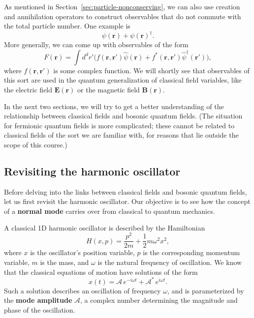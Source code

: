 \documentclass[prx,12pt]{revtex4-2}
\begin{document}
As mentioned in Section~\ref{sec:particle-nonconserving}, we can also
use creation and annihilation operators to construct observables that
do not commute with the total particle number.  One example is
\begin{equation*}
  \psi(\mathbf{r}) + \psi(\mathbf{r})^\dagger.
\end{equation*}
More generally, we can come up with observables of the form
\begin{equation}
  F(\mathbf{r}) = \int d^dr' \Big(f(\mathbf{r},\mathbf{r}') \hat{\psi}(\mathbf{r}) + f^*(\mathbf{r},\mathbf{r}') \hat{\psi}^\dagger(\mathbf{r}') \Big),
  \label{fieldop}
\end{equation}
where $f(\mathbf{r},\mathbf{r}')$ is some complex function.  We will
shortly see that observables of this sort are used in the quantum
generalization of classical field variables, like the electric field
$\mathbf{E}(\mathbf{r})$ or the magnetic field
$\mathbf{B}(\mathbf{r})$.

In the next two sections, we will try to get a better understanding of
the relationship between classical fields and bosonic quantum fields.
(The situation for fermionic quantum fields is more complicated; these
cannot be related to classical fields of the sort we are familiar
with, for reasons that lie outside the scope of this course.)

\subsection{Revisiting the harmonic oscillator}
\label{sec:ho}

Before delving into the links between classical fields and bosonic
quantum fields, let us first revisit the harmonic oscillator.  Our
objective is to see how the concept of a \textbf{normal mode} carries
over from classical to quantum mechanics.

A classical 1D harmonic oscillator is described by the Hamiltonian
\begin{equation}
  H(x,p) = \frac{p^2}{2m} + \frac{1}{2}m\omega^2x^2,
  \label{Hclass}
\end{equation}
where $x$ is the oscillator's position variable, $p$ is the
corresponding momentum variable, $m$ is the mass, and $\omega$ is the
natural frequency of oscillation.  We know that the classical
equations of motion have solutions of the form
\begin{equation}
  x(t) = \mathcal{A}\, e^{-i\omega t} + \mathcal{A}^*\, e^{i\omega t}.
  \label{xt0}
\end{equation}
Such a solution describes an oscillation of frequency $\omega$, and is
parameterized by the \textbf{mode amplitude} $\mathcal{A}$, a complex
number determining the magnitude and phase of the oscillation.
\end{document}
